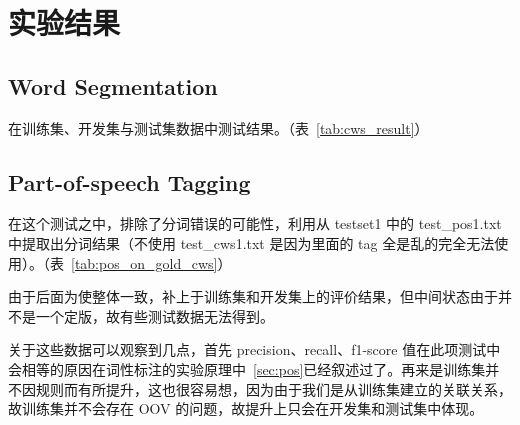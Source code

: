 \section{实验结果}
\label{sec:result}

\subsection*{Word Segmentation}

在训练集、开发集与测试集数据中测试结果。（表~\ref{tab:cws_result}）



\subsection*{Part-of-speech Tagging}


在这个测试之中，排除了分词错误的可能性，利用从 testset1 中的 test\_pos1.txt 中提取出分词结果（不使用 test\_cws1.txt 是因为里面的 tag 全是乱的完全无法使用）。（表~\ref{tab:pos_on_gold_cws}）

由于后面为使整体一致，补上于训练集和开发集上的评价结果，但中间状态由于并不是一个定版，故有些测试数据无法得到。

关于这些数据可以观察到几点，首先 precision、recall、f1-score 值在此项测试中会相等的原因在词性标注的实验原理中~\ref{sec:pos}已经叙述过了。再来是训练集并不因规则而有所提升，这也很容易想，因为由于我们是从训练集建立的关联关系，故训练集并不会存在 OOV 的问题，故提升上只会在开发集和测试集中体现。





% 
